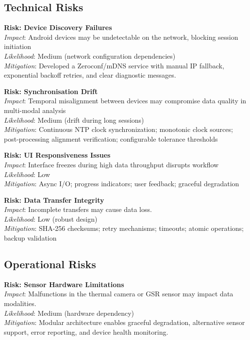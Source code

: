 \subsection{Technical Risks}
\textbf{Risk: Device Discovery Failures}\\
\emph{Impact}: Android devices may be undetectable on the network, blocking session initiation\\
\emph{Likelihood}: Medium (network configuration dependencies)\\
\emph{Mitigation}: Developed a Zeroconf/mDNS service with manual IP fallback, exponential backoff retries, and clear diagnostic messages.

\textbf{Risk: Synchronisation Drift}\\
\emph{Impact}: Temporal misalignment between devices may compromise data quality in multi-modal analysis\\
\emph{Likelihood}: Medium (drift during long sessions)\\
\emph{Mitigation}: Continuous NTP clock synchronization; monotonic clock sources; post-processing alignment verification; configurable tolerance thresholds

\textbf{Risk: UI Responsiveness Issues}\\
\emph{Impact}: Interface freezes during high data throughput disrupts workflow\\
\emph{Likelihood}: Low\\
\emph{Mitigation}: Async I/O; progress indicators; user feedback; graceful degradation

\textbf{Risk: Data Transfer Integrity}\\
\emph{Impact}: Incomplete transfers may cause data loss.\\
\emph{Likelihood}: Low (robust design)\\
\emph{Mitigation}: SHA-256 checksums; retry mechanisms; timeouts; atomic operations; backup validation

\subsection{Operational Risks}
\textbf{Risk: Sensor Hardware Limitations}\\
\emph{Impact}: Malfunctions in the thermal camera or GSR sensor may impact data modalities.\\
\emph{Likelihood}: Medium (hardware dependency)\\
\emph{Mitigation}: Modular architecture enables graceful degradation, alternative sensor support, error reporting, and device health monitoring.

